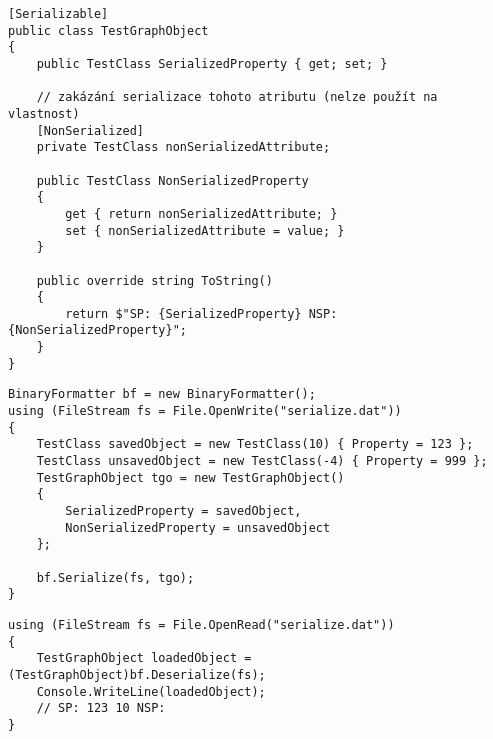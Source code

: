 \begin{frame}[fragile]
\begin{yesblock}
\begin{lstlisting}
[Serializable]
public class TestGraphObject
{
    public TestClass SerializedProperty { get; set; }

    // zakázání serializace tohoto atributu (nelze použít na vlastnost)
    [NonSerialized] 
    private TestClass nonSerializedAttribute;

    public TestClass NonSerializedProperty
    {
        get { return nonSerializedAttribute; }
        set { nonSerializedAttribute = value; }
    }

    public override string ToString()
    {
        return $"SP: {SerializedProperty} NSP: {NonSerializedProperty}";
    }
}
\end{lstlisting}
\end{yesblock}
\end{frame}




\begin{frame}[fragile]
\begin{yesblock}
\begin{lstlisting}
BinaryFormatter bf = new BinaryFormatter();
using (FileStream fs = File.OpenWrite("serialize.dat"))
{
    TestClass savedObject = new TestClass(10) { Property = 123 };
    TestClass unsavedObject = new TestClass(-4) { Property = 999 };
    TestGraphObject tgo = new TestGraphObject()
    {
        SerializedProperty = savedObject,
        NonSerializedProperty = unsavedObject
    };

    bf.Serialize(fs, tgo);
}      
\end{lstlisting}
\end{yesblock}
\end{frame}



\begin{frame}[fragile]
\begin{yesblock}
\begin{lstlisting}
using (FileStream fs = File.OpenRead("serialize.dat"))
{
    TestGraphObject loadedObject = (TestGraphObject)bf.Deserialize(fs);
    Console.WriteLine(loadedObject);
    // SP: 123 10 NSP:
}
\end{lstlisting}
\end{yesblock}
\end{frame}




